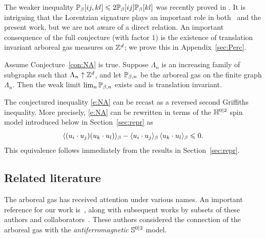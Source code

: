 \documentclass[11pt]{amsart}
\numberwithin{equation}{section}
\numberwithin{theorem}{section}
\begin{document}
The weaker inequality 
$\P_\beta[ij,kl] \leq 2\P_\beta[ij] \P_\beta[kl]$
was recently proved in \cite{1902.03719}. It is intriguing that the Lorentzian
signature plays an important role in both~\cite{1902.03719} and the
present work, but we are not aware of a direct relation.  An important
consequence of the full conjecture (with factor $1$) is the existence
of translation invariant arboreal gas measures on $\Z^d$; we prove
this in Appendix~\ref{sec:Perc}.


\begin{proposition} 
  \label{prop:subseq}
  Assume Conjecture~\ref{con:NA} is true. Suppose $\Lambda_{n}$ is an
  increasing family of subgraphs such that
  $\Lambda_{n}\uparrow \Z^{d}$, and let $\P_{\beta,n}$ be the arboreal
  gas on the finite graph $\Lambda_{n}$. Then the weak limit
  $\lim_{n}\P_{\beta,n}$ exists and is translation invariant. 
\end{proposition}


\begin{remark}
  The conjectured inequality \eqref{e:NA}
  can be recast as a reversed second Griffiths inequality. More
  precisely, \eqref{e:NA} can be rewritten in terms of the
  $\HH^{0|2}$ spin model introduced below in Section~\ref{sec:repr} as 
  \begin{equation}
    \avg{(u_i\cdot u_j)(u_k\cdot u_l)}_\beta -    \avg{u_i\cdot
      u_j}_\beta\,\avg{u_k\cdot u_l}_\beta \leq 0. 
  \end{equation}
  This equivalence follows immediately from the results in
  Section~\ref{sec:repr}.
\end{remark}

\subsection{Related literature}
\label{sec:lit}

The arboreal gas has received attention under various names. 
An important reference for our work is~\cite{MR2110547},
along with subsequent works by subsets of these authors and
collaborators~\cite{MR2437672,MR2450506,MR2567041,MR2529812,MR3622573,MR2142209}.
These authors considered the connection of the arboreal gas with the
\emph{antiferromagnetic} $\bbS^{0|2}$ model.
\end{document}
